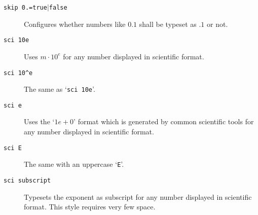 \begin{description}

\item[\texttt{skip 0.=true$|$false}]
	Configures whether numbers like $0.1$ shall be typeset as $.1$ or not.
{\def\examplenumbers{0.56,0.01}%


}

\item[\texttt{sci 10e}] Uses $m \cdot 10^e$ for any number displayed in scientific format.


\item[\texttt{sci 10\textasciicircum e}] The same as `\texttt{sci 10e}'.

\item[\texttt{sci e}] Uses the `$1e{+}0$' format which is generated by common scientific tools for any number displayed in scientific format.


\item[\texttt{sci E}] The same with an uppercase `\texttt{E}'.


\item[\texttt{sci subscript}] Typesets the exponent as subscript for any number displayed in scientific format. This style requires very few space.

\end{description}

